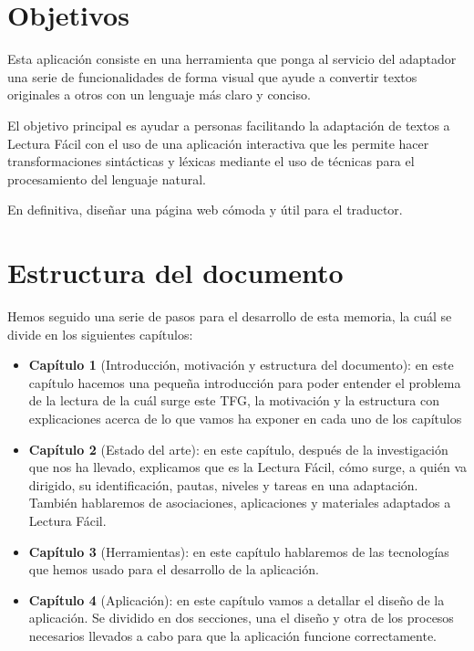 \section{Objetivos}
Esta aplicación consiste en una herramienta que ponga al servicio del adaptador una serie de funcionalidades de forma visual que ayude a convertir textos originales a otros con un lenguaje más claro y conciso.

 \setlength{\parskip}{10pt}
 
El objetivo principal es ayudar a personas facilitando la adaptación de textos a Lectura Fácil con el uso de una aplicación interactiva que les permite hacer transformaciones sintácticas y léxicas mediante el uso de técnicas para el procesamiento del lenguaje natural. 

 \setlength{\parskip}{10pt}


En definitiva, diseñar una página web cómoda y útil para el traductor.

\section{Estructura del documento}


Hemos seguido una serie de pasos para el desarrollo de esta memoria, la cuál se divide en los siguientes capítulos:

\begin{itemize}
	\item {\textbf{Capítulo 1}} (Introducción, motivación y estructura del documento): en este capítulo hacemos una pequeña introducción para poder entender el problema de la lectura de la cuál surge este TFG, la motivación y la estructura con explicaciones acerca de lo que vamos ha exponer en cada uno de los capítulos
	
 \setlength{\parskip}{10pt}
	
	\item{\textbf{Capítulo 2}} (Estado del arte): en este capítulo, después de la investigación que nos ha llevado, explicamos que es la Lectura Fácil, cómo surge, a quién va dirigido, su identificación, pautas, niveles y tareas en una adaptación. También hablaremos de asociaciones, aplicaciones y materiales adaptados a Lectura Fácil. 

 \setlength{\parskip}{10pt}

\item{\textbf{Capítulo 3}} (Herramientas): en este capítulo hablaremos de las tecnologías que hemos usado para el desarrollo de la aplicación.
 \setlength{\parskip}{10pt}

\item{\textbf{Capítulo 4}} (Aplicación): en este capítulo vamos a detallar el diseño de la aplicación. Se dividido en dos secciones, una el diseño y otra de los procesos necesarios llevados a cabo para que la aplicación funcione correctamente.

\end{itemize}

